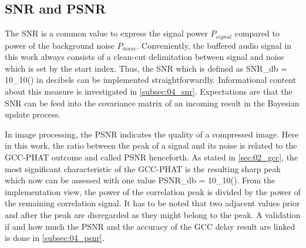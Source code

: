 
\subsection{SNR and PSNR}
\label{subsec:03_snr}

The \acf{SNR} is a common value to express the signal power $P_{signal}$ compared
to power of the background noise $P_{noise}$.
Conveniently, the buffered audio signal in this work always consists of
a clean-cut delimitation between signal and noise which is set by the
start index.
Thus, the \ac{SNR} which is defined as
\bal
    SNR_{db} = 10\log_{10}\left(\right)
    \label{eq:03_snr}
\eal
in decibels can be implemented straightforwardly.
Informational content about this measure is investigated in \cref{subsec:04_snr}.
Expectations are that the \ac{SNR} can be feed into the covariance matrix
of an incoming result in the Bayesian update process.

In image processing, the \acf{PSNR} indicates the quality of a compressed
image. Here in this work, the ratio between the peak of a signal
and its noise is related to the \ac{GCC-PHAT} outcome and called \ac{PSNR}
henceforth.
As stated in \cref{sec:02_gcc}, the most significant characteristic
of the \ac{GCC-PHAT} is the resulting sharp peak which now can be
assessed with one value
\bal
    PSNR_{db} = 10\log_{10}\left(\right).
    \label{eq:03_psnr}
\eal
From the implementation view, the power of the correlation peak is divided by
the power of the remaining correlation signal.
It has to be noted that two adjacent values prior and after the peak
are disregarded as they might belong to the peak.
A validation if and how much the \ac{PSNR} and the accuracy of the \ac{GCC}
delay result are linked is done in \cref{subsec:04_psnr}.